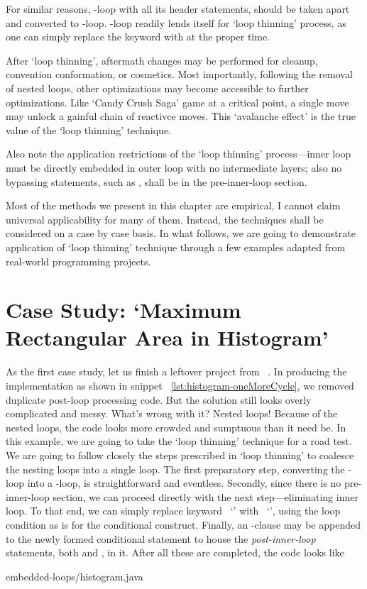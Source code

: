 For similar reasons, -loop with all its header statements, should be taken apart and
converted to -loop.
-loop readily lends itself for `loop thinning' process, as one can
simply replace the keyword  with  at the proper time.


After `loop thinning',
aftermath changes may be performed for cleanup, convention conformation, or cosmetics.
Most importantly, following the removal of nested loops, other optimizations may become
accessible to further optimizations.
Like `Candy Crush Saga' game at a critical point, a single move may unlock a
gainful chain of reactivce moves.
This `avalanche effect' is the true value of the `loop thinning' technique.


Also note the application restrictions of the `loop thinning' process---inner loop must be directly
embedded in
outer loop with no intermediate layers;
also no bypassing statements, such as , shall be in the pre-inner-loop section.


Most of the methods we present in this chapter are empirical, I cannot claim
universal applicability for many of them.
Instead, the techniques shall be considered on a case by case basis.
In what follows, we are going to demonstrate application of `loop thinning' technique through
a few examples adapted from real-world programming projects.


\section{Case Study: `Maximum Rectangular Area in Histogram'}
\label{sec:nested-loop-histogram}

As the first case study, let us finish a leftover project from ~.
In producing the implementation as shown in snippet ~\autoref{lst:histogram-oneMoreCycle},
we removed duplicate post-loop processing code.
But the solution still looks overly complicated and messy.
What's wrong with it?
Nested loops!
Because of the nested loops, the code looks more crowded and sumptuous than it need be.
In this example, we are going to take the `loop thinning' technique for a road test.
We are going to follow closely the steps prescribed in `loop thinning' to coalesce the
nesting loops into a single loop.
The first preparatory step, converting the -loop into a -loop, is
straightforward and eventless.
Secondly, since there is no pre-inner-loop section, we can proceed directly with the next
step---eliminating inner loop.
To that end, we can simply replace keyword ~`' with ~`', using the loop
condition as is for the conditional construct.
Finally, an -clause may be appended to the newly formed conditional statement to
house the \emph{post-inner-loop} statements, both  and , in it.
After all these are completed, the code looks like

{embedded-loops/histogram.java}



